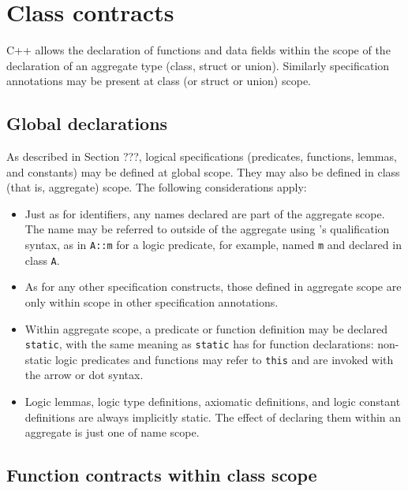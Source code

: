 \section{Class contracts}
\label{sec:class-contracts}

C++ allows the declaration of functions and data fields within
the scope of the declaration of an aggregate type (class, struct or union). Similarly \NAME{} specification annotations
may be present at class (or struct or union) scope.

\subsection{Global declarations}

As described in Section ???, logical specifications (predicates, functions, lemmas, and constants) may be defined at global scope. They may also be defined in class (that is, aggregate) scope. The following considerations apply:
\begin{itemize}
	\item Just as for \lang{} identifiers, any names 
	declared are part of the aggregate scope. The name may
	be referred to outside of the aggregate using \lang's 
	qualification syntax, as in \lstinline|A::m| for a 
	logic predicate, for example, named \lstinline|m| and
	declared in class \lstinline|A|.
	\item As for any other specification constructs, those defined in aggregate scope are only within scope in other specification annotations.
	\item Within aggregate scope, a predicate or function definition may be
	declared \lstinline|static|, with the same meaning as 
	\lstinline|static| has for \lang{} function 
	declarations: non-static logic predicates and functions
	may refer to \lstinline|this| and are invoked with the
	\lang{} arrow or dot syntax.

	\item Logic lemmas, logic type definitions, axiomatic definitions, and logic constant definitions are always implicitly static. The effect of declaring them within an aggregate is just one of name scope.
\end{itemize}



\subsection{Function contracts within class scope}

